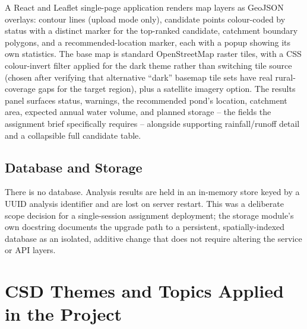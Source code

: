 \documentclass[manuscript,screen]{acmart}
\begin{document}
A React and Leaflet single-page application renders map layers as GeoJSON
overlays: contour lines (upload mode only), candidate points colour-coded
by status with a distinct marker for the top-ranked candidate, catchment
boundary polygons, and a recommended-location marker, each with a popup
showing its own statistics. The base map is standard OpenStreetMap raster
tiles, with a CSS colour-invert filter applied for the dark theme rather
than switching tile source (chosen after verifying that alternative
``dark'' basemap tile sets have real rural-coverage gaps for the target
region), plus a satellite imagery option. The results panel surfaces
status, warnings, the recommended pond's location, catchment area,
expected annual water volume, and planned storage -- the fields the
assignment brief specifically requires -- alongside supporting
rainfall/runoff detail and a collapsible full candidate table.

\subsection{Database and Storage}
There is no database. Analysis results are held in an in-memory store
keyed by a UUID analysis identifier and are lost on server restart. This
was a deliberate scope decision for a single-session assignment
deployment; the storage module's own docstring documents the upgrade path
to a persistent, spatially-indexed database as an isolated, additive
change that does not require altering the service or API layers.

\section{CSD Themes and Topics Applied in the Project}
\label{sec:csd-themes}
\end{document}

